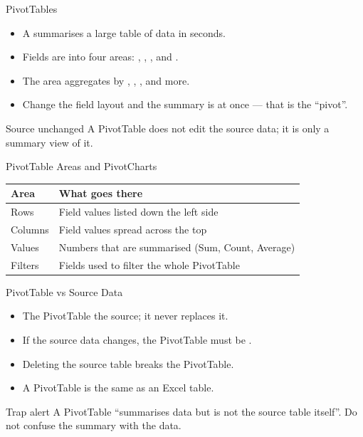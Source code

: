 \documentclass[aspectratio=169]{beamer}
\begin{document}
\begin{frame}{PivotTables}
  \begin{itemize}
    \item A  summarises a large table of data in seconds.
    \item Fields are  into four areas: , ,
      , and .
    \item The  area aggregates by , ,
      , and more.
    \item Change the field layout and the summary is  at once
      --- that is the ``pivot''.
  \end{itemize}
  \begin{block}{Source unchanged}
    A PivotTable does not edit the source data; it is only a summary view of it.
  \end{block}
\end{frame}

\begin{frame}{PivotTable Areas and PivotCharts}
  \begin{center}
    \begin{tabular}{p{}p{}}
      \toprule
      \textbf{Area} & \textbf{What goes there} \\
      \midrule
      Rows & Field values listed down the left side \\
      Columns & Field values spread across the top \\
      Values & Numbers that are summarised (Sum, Count, Average) \\
      Filters & Fields used to filter the whole PivotTable \\
      \bottomrule
    \end{tabular}
  \end{center}
  \vspace{0.2cm}
\end{frame}

\begin{frame}{PivotTable vs Source Data}
  \begin{itemize}
    \item The PivotTable  the source; it never replaces it.
    \item If the source data changes, the PivotTable must be .
    \item Deleting the source table breaks the PivotTable.
    \item A PivotTable is  the same as an Excel table.
  \end{itemize}
  \begin{alertblock}{Trap alert}
    A PivotTable ``summarises data but is not the source table itself''. Do not
    confuse the summary with the data.
  \end{alertblock}
\end{frame}
\end{document}
